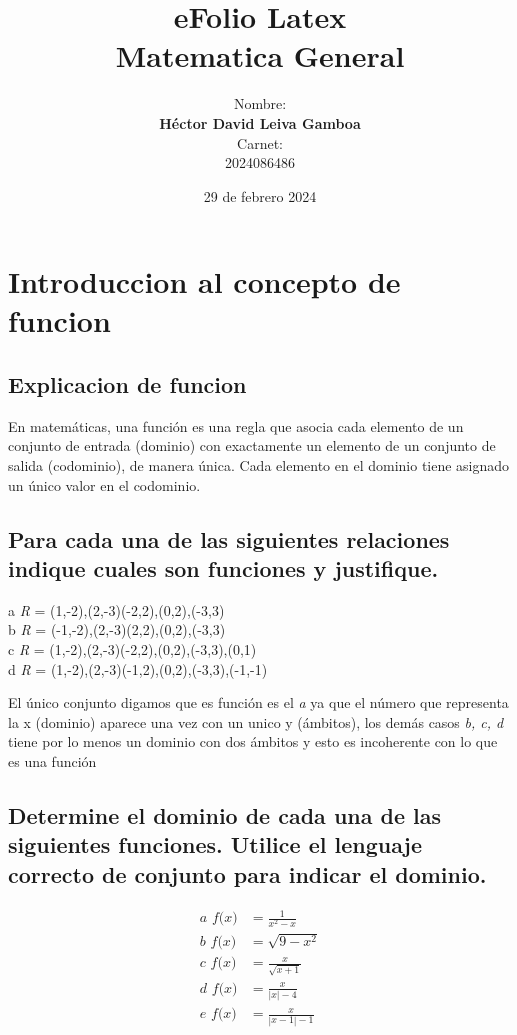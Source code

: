 \documentclass[titlepage,12pt]{article}
\title{
\fontsize{50pt}{20pt}\textbf{eFolio Latex}\\
Matematica General
}
\author{
Nombre:\\
\fontsize{15pt}{20pt}\textbf{Héctor David Leiva Gamboa}\\
Carnet:\\ 
2024086486
}
\date{
\fontsize{10pt}{20pt}29 de febrero 2024
}
\begin{document}
\maketitle

\tableofcontents

\newpage

\section{Introduccion al concepto de funcion}
\subsection{Explicacion de funcion}
En matemáticas, una función es una regla que asocia cada elemento de un conjunto de entrada (dominio) con exactamente un elemento de un conjunto de salida (codominio), de manera única. Cada elemento en el dominio tiene asignado un único valor en el codominio.
\subsection{Para cada una de las siguientes relaciones indique cuales son funciones y justifique.}
a \textit{R} = {(1,-2),(2,-3)(-2,2),(0,2),(-3,3)}\\
b \textit{R} = {(-1,-2),(2,-3)(2,2),(0,2),(-3,3)}\\
c \textit{R} = {(1,-2),(2,-3)(-2,2),(0,2),(-3,3),(0,1)}\\
d \textit{R} = {(1,-2),(2,-3)(-1,2),(0,2),(-3,3),(-1,-1)}

El único conjunto digamos que es función es el  \textit{a} ya que el número que representa la x (dominio) aparece una vez con un unico y (ámbitos), los demás casos \textit{b, c, d} tiene por lo menos un dominio con dos ámbitos y esto es incoherente con lo que es una función\\
\subsection{Determine el dominio de cada una de las siguientes funciones. Utilice el
lenguaje correcto de conjunto para indicar el dominio.}
\setlength{\jot}{1em}
\begin{align*}
    a \textit{ f(x)} &= \frac{1}{x^2-x}\\
    b \textit{ f(x)} &= \sqrt{9-x^2}\\
    c \textit{ f(x)} &= \frac{x}{\sqrt{x+1}}\\
    d \textit{ f(x)} &= \frac{x}{|x|-4}\\
    e \textit{ f(x)} &= \frac{x}{|x-1|-1}
\end{align*}
\end{document}
